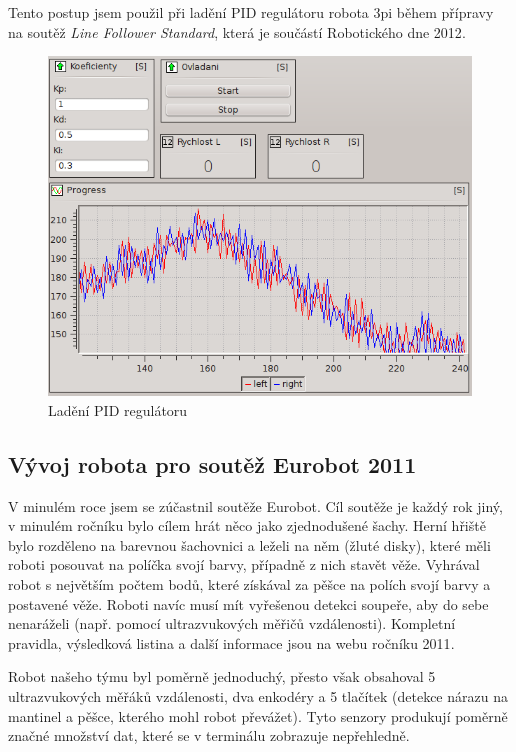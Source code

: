 \documentclass[12pt, a4paper, oneside]{article}
\newcommand{\It}{\textit}  %
\begin{document}
Tento postup jsem použil při ladění PID regulátoru robota 3pi\cite{3pi} během přípravy na soutěž \It{Line Follower Standard}, která je součástí Robotického dne 2012\cite{rob_den}.
\begin{figure}[H]
\begin{center}
\includegraphics[scale=0.55]{img/use_pid.png}
\caption{Ladění PID regulátoru}
\end{center}
\end{figure}

\newpage
\subsection{Vývoj robota pro soutěž Eurobot 2011}
V minulém roce jsem se zúčastnil soutěže Eurobot\cite{eurobot}. Cíl soutěže je každý rok jiný, v minulém ročníku bylo cílem hrát něco jako zjednodušené šachy. Herní hřiště bylo rozděleno na barevnou šachovnici a leželi na něm  (žluté disky), které měli roboti posouvat na políčka svojí barvy, případně z nich stavět věže. Vyhrával robot s největším počtem bodů, které získával za pěšce na polích svojí barvy a postavené věže. Roboti navíc musí mít vyřešenou detekci soupeře, aby do sebe nenaráželi (např. pomocí ultrazvukových měřičů vzdálenosti). Kompletní pravidla, výsledková listina a další informace jsou na webu ročníku 2011\cite{eurobot11}.

Robot našeho týmu byl poměrně jednoduchý, přesto však obsahoval 5 ultrazvukových měřáků vzdálenosti, dva enkodéry a 5 tlačítek (detekce nárazu na mantinel a pěšce, kterého mohl robot převážet). Tyto senzory produkují poměrně značné množství dat, které se v terminálu zobrazuje nepřehledně.
\end{document}
